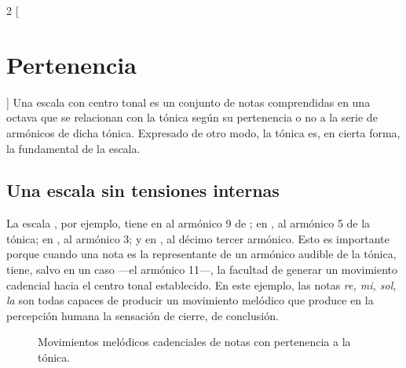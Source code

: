\documentclass[a4paper,11pt]{article}
\begin{document}
\newpage
\begin{multicols}{2}
[\section{Pertenencia}\label{sec:pertenencia}]
  Una escala con centro tonal es un conjunto de notas comprendidas en una octava que se relacionan con la tónica según su pertenencia o no a la serie de armónicos de dicha tónica. Expresado de otro modo, la tónica es, en cierta forma, la fundamental de la escala.

    \subsection{Una escala sin tensiones internas}\label{subsec:escala-sin-tensiones}
    La escala \hbox{,} por ejemplo, tiene en  al armónico 9 de \hbox{;} en \hbox{,} al armónico 5 de la tónica; en \hbox{,} al armónico 3; y en \hbox{,} al décimo tercer armónico. Esto es importante porque cuando una nota es la representante de un armónico audible de la tónica, tiene, salvo en un caso ---el armónico 11---, la facultad de generar un movimiento cadencial hacia el centro tonal establecido. En este ejemplo, las notas \emph{re, mi, sol, la} son todas capaces de producir un movimiento melódico que produce en la percepción humana la sensación de cierre, de conclusión.
\end{multicols}

\begin{figure}[ht]
\centering
\caption{Movimientos melódicos cadenciales de notas con pertenencia a la tónica.}\label{fig:mov-cad}
\end{figure}
\end{document}
